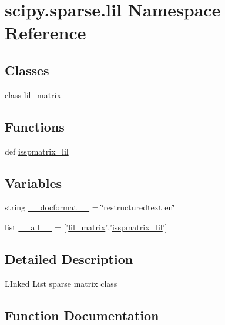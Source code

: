 \hypertarget{namespacescipy_1_1sparse_1_1lil}{}\section{scipy.\+sparse.\+lil Namespace Reference}
\label{namespacescipy_1_1sparse_1_1lil}
\subsection*{Classes}
\begin{DoxyCompactItemize}
\item 
class \hyperlink{classscipy_1_1sparse_1_1lil_1_1lil__matrix}{lil\+\_\+matrix}
\end{DoxyCompactItemize}
\subsection*{Functions}
\begin{DoxyCompactItemize}
\item 
def \hyperlink{namespacescipy_1_1sparse_1_1lil_a5fe66be4b2dd2a93d2870a6687746c99}{isspmatrix\+\_\+lil}
\end{DoxyCompactItemize}
\subsection*{Variables}
\begin{DoxyCompactItemize}
\item 
string \hyperlink{namespacescipy_1_1sparse_1_1lil_a3ae45926d5792f98d51a219f476a44a9}{\+\_\+\+\_\+docformat\+\_\+\+\_\+} = \char`\"{}restructuredtext en\char`\"{}
\item 
list \hyperlink{namespacescipy_1_1sparse_1_1lil_a724fd594809ae4c329f20c5798e4ae24}{\+\_\+\+\_\+all\+\_\+\+\_\+} = \mbox{[}'\hyperlink{classscipy_1_1sparse_1_1lil_1_1lil__matrix}{lil\+\_\+matrix}','\hyperlink{namespacescipy_1_1sparse_1_1lil_a5fe66be4b2dd2a93d2870a6687746c99}{isspmatrix\+\_\+lil}'\mbox{]}
\end{DoxyCompactItemize}


\subsection{Detailed Description}
\begin{DoxyVerb}LInked List sparse matrix class
\end{DoxyVerb}
 

\subsection{Function Documentation}
\hypertarget{namespacescipy_1_1sparse_1_1lil_a5fe66be4b2dd2a93d2870a6687746c99}{}

